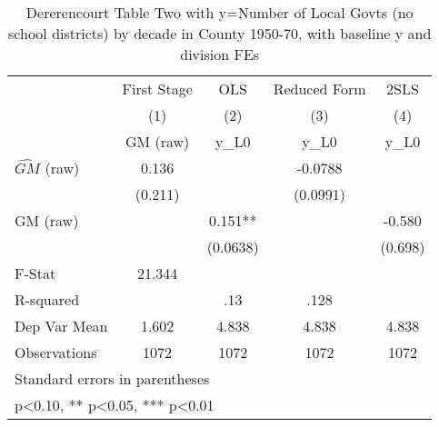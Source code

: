 \begin{table}[htbp]\centering
\def\sym#1{\ifmmode^{#1}\else\(^{#1}\)\fi}
\caption{Dererencourt Table Two with y=Number of Local Govts (no school districts) by decade in County 1950-70, with baseline y and division FEs}
\begin{tabular}{l*{4}{c}}
\toprule
                    & First Stage   &         OLS   &Reduced Form   &        2SLS   \\
                    &\multicolumn{1}{c}{(1)}&\multicolumn{1}{c}{(2)}&\multicolumn{1}{c}{(3)}&\multicolumn{1}{c}{(4)}\\
                    &\multicolumn{1}{c}{GM  (raw)}&\multicolumn{1}{c}{y\_L0}&\multicolumn{1}{c}{y\_L0}&\multicolumn{1}{c}{y\_L0}\\
\midrule
$\hat{GM}$ (raw)    &       0.136   &               &     -0.0788   &               \\
                    &     (0.211)   &               &    (0.0991)   &               \\
\addlinespace
GM  (raw)           &               &       0.151** &               &      -0.580   \\
                    &               &    (0.0638)   &               &     (0.698)   \\
\midrule
F-Stat              &      21.344   &               &               &               \\
R-squared           &               &         .13   &        .128   &               \\
Dep Var Mean        &       1.602   &       4.838   &       4.838   &       4.838   \\
Observations        &        1072   &        1072   &        1072   &        1072   \\
\bottomrule
\multicolumn{5}{l}{\footnotesize Standard errors in parentheses}\\
\multicolumn{5}{l}{\footnotesize * p<0.10, ** p<0.05, *** p<0.01}\\
\end{tabular}
\end{table}
